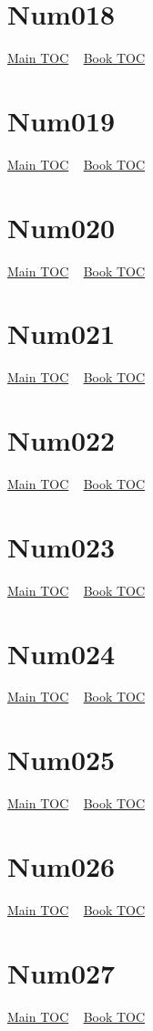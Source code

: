\documentclass{book}
\begin{document}
  \section{Num018}\hyperlink{toc}{Main TOC} ~ \hyperref[subsec:Num]{Book TOC} 
  \section{Num019}\hyperlink{toc}{Main TOC} ~ \hyperref[subsec:Num]{Book TOC} 
  \section{Num020}\hyperlink{toc}{Main TOC} ~ \hyperref[subsec:Num]{Book TOC} 
  \section{Num021}\hyperlink{toc}{Main TOC} ~ \hyperref[subsec:Num]{Book TOC} 
  \section{Num022}\hyperlink{toc}{Main TOC} ~ \hyperref[subsec:Num]{Book TOC} 
  \section{Num023}\hyperlink{toc}{Main TOC} ~ \hyperref[subsec:Num]{Book TOC} 
  \section{Num024}\hyperlink{toc}{Main TOC} ~ \hyperref[subsec:Num]{Book TOC} 
  \section{Num025}\hyperlink{toc}{Main TOC} ~ \hyperref[subsec:Num]{Book TOC} 
  \section{Num026}\hyperlink{toc}{Main TOC} ~ \hyperref[subsec:Num]{Book TOC} 
  \section{Num027}\hyperlink{toc}{Main TOC} ~ \hyperref[subsec:Num]{Book TOC} 
\end{document}
